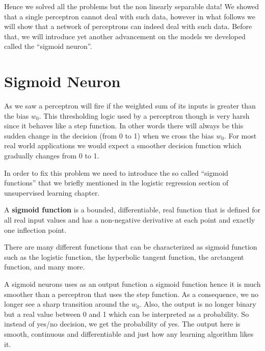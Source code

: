 Hence we solved all the problems but the non linearly separable data! We showed that a single perceptron cannot deal
with such data, however in what follows we will show that a network of perceptrons can indeed deal with such data.
Before that, we will introduce yet another advancement on the models we developed called the ``sigmoid neuron''.

\section{Sigmoid Neuron}

As we saw a perceptron will fire if the weighted sum of its inputs is greater than the bias $w_0$. This thresholding
logic used by a perceptron though is very harsh since it behaves like a step function. In other words there will
always be this sudden change in the decision (from 0 to 1) when we cross the bias $w_0$. For most real world
applications we would expect a smoother decision function which gradually changes from 0 to 1.


In order to fix this problem we need to introduce the so called ``sigmoid functions'' that we briefly mentioned in
the logistic regression section of unsupervised learning chapter.

A \textbf{sigmoid function} is a bounded, differentiable, real function that is defined for all real input values and
has a non-negative derivative at each point and exactly one inflection point.
\ed

There are many different functions that can be characterized as sigmoid function such as the logistic function, the
hyperbolic tangent function, the arctangent function, and many more.


A sigmoid neurons uses as an output function a sigmoid function hence it is much smoother than a perceptron that uses
the step function. As a consequence, we no longer see a sharp transition around the $w_0$. Also, the output is no
longer binary but a real value between 0 and 1 which can be interpreted as a probability. So instead of yes/no
decision, we get the probability of yes. The output here is smooth, continuous and differentiable and just how any
learning algorithm likes it.

\vspace{10pt}


